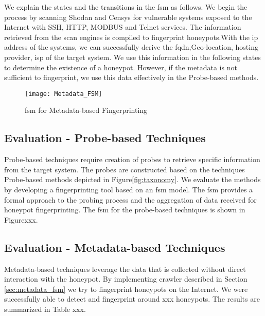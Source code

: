 We explain the states and the transitions in the \acrshort{fsm} as follows. We begin the process by scanning Shodan and Censys for vulnerable systems exposed to the Internet with SSH, HTTP, MODBUS and Telnet services. The information retrieved from the scan engines is compiled to fingerprint honeypots.With the \acrshort{ip} address of the systems, we can successfully derive the \acrshort{fqdn},Geo-location, hosting provider, \acrshort{isp} of the target system. We use this information in the following states to determine the existence of a honeypot. However, if the metadata is not sufficient to fingerprint, we use this data effectively in the Probe-based methods. 

\begin{figure}[ht]
    \centering
    \texttt{[image: Metadata\_FSM]}
    \caption{\acrshort{fsm} for Metadata-based Fingerprinting }
    \label{fig:fsm_md}
\end{figure}


\subsection{Evaluation - Probe-based Techniques}
Probe-based techniques require creation of probes to retrieve specific information from the target system. The probes are constructed based on the techniques Probe-based methods depicted in Figure\ref{fig:taxonomy}. We evaluate the methods by developing a fingerprinting tool based on an \acrfull{fsm} model. The \acrshort{fsm} provides a formal approach to the probing process and the aggregation of data received for honeypot fingerprinting. The \acrshort{fsm} for the probe-based techniques is shown in Figurexxx. 


\subsection{Evaluation - Metadata-based Techniques}
Metadata-based techniques leverage the data that is collected without direct interaction with the honeypot. By implementing crawler described in Section \ref{sec:metadata_fsm} we try to fingerprint honeypots on the Internet. We were successfully able to detect and fingerprint around xxx honeypots. The results are summarized in Table xxx.  


